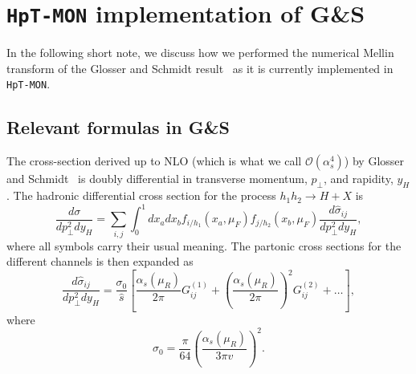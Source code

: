 \documentclass[10pt]{report}
\begin{document}
\setcounter{page}{0}

\chapter{\texttt{HpT-MON} implementation of G\&S}

In the following short note, we discuss how we performed the numerical Mellin transform of the Glosser and Schmidt result~\cite{Glosser2003} as it is currently implemented in \texttt{HpT-MON}.

\section{Relevant formulas in G\&S~\cite{Glosser2003}}

The cross-section derived up to NLO (which is what we call $\mathcal{O}\left(\alpha_s^4\right)$) by Glosser and Schmidt~\cite{Glosser2003} is doubly differential in transverse momentum, $p_\perp$, and rapidity, $y_H$. The hadronic differential cross section for the process $h_1 h_2 \rightarrow H+X$ is 
\begin{equation}
\frac{d \sigma}{d p_{\perp}^{2} d y_{H}}=\sum_{i, j} \int_{0}^{1} d x_{a} d x_{b} f_{i / h_{1}}\left(x_{a}, \mu_{F}\right) f_{j / h_{2}}\left(x_{b}, \mu_{F}\right) \frac{d \hat{\sigma}_{i j}}{d p_{\perp}^{2} d y_{H}},
\end{equation}
where all symbols carry their usual meaning. The partonic cross sections for the different channels is then expanded as 
\begin{equation}
\frac{d \hat{\sigma}_{i j}}{d p_{\perp}^{2} d y_{H}}=\frac{\sigma_{0}}{\hat{s}}\left[\frac{\alpha_{s}\left(\mu_{R}\right)}{2 \pi} G_{i j}^{(1)}+\left(\frac{\alpha_{s}\left(\mu_{R}\right)}{2 \pi}\right)^{2} G_{i j}^{(2)}+\ldots\right],
\label{eq:dsigmah/dpt2dyh=expanded}
\end{equation}
where
\begin{equation}
\sigma_{0}=\frac{\pi}{64}\left(\frac{\alpha_{s}\left(\mu_{R}\right)}{3 \pi v}\right)^{2}.
\end{equation}
\end{document}
